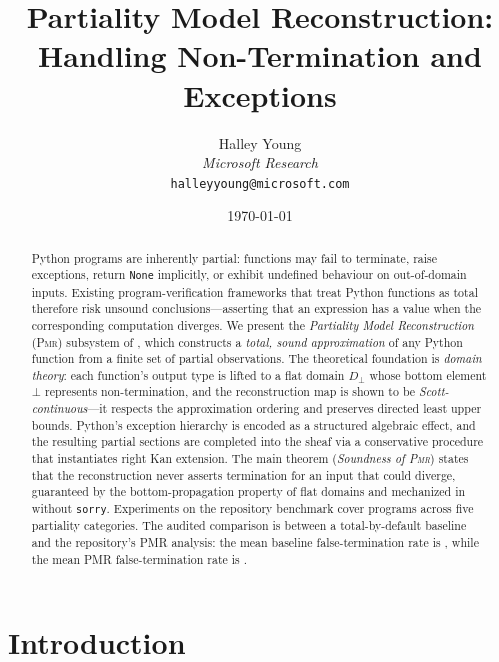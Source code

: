 \documentclass[11pt]{article}
\title{\textbf{Partiality Model Reconstruction:\\
  Handling Non-Termination and Exceptions}}
\author{%
  Halley Young\\
  \textit{Microsoft Research}\\
  \texttt{halleyyoung@microsoft.com}%
}
\date{\today}
\newcommand{\LiftD}[1]{#1_{\bot}}           %
\newcommand{\PMR}{\textsc{Pmr}}            %
\begin{document}
\maketitle

\begin{abstract}
Python programs are inherently partial: functions may fail to terminate,
raise exceptions, return \texttt{None} implicitly, or exhibit undefined
behaviour on out-of-domain inputs.  Existing program-verification
frameworks that treat Python functions as total therefore risk unsound
conclusions---asserting that an expression has a value when the
corresponding computation diverges.
We present the \emph{Partiality Model Reconstruction} (\PMR{}) subsystem
of \JuGeo{}, which constructs a \emph{total, sound approximation} of any
Python function from a finite set of partial observations.
The theoretical foundation is \emph{domain theory}: each function's
output type is lifted to a flat domain $\LiftD{D}$ whose bottom element
$\bot$ represents non-termination, and the reconstruction map is shown
to be \emph{Scott-continuous}---it respects the approximation ordering
and preserves directed least upper bounds.
Python's exception hierarchy is encoded as a structured algebraic effect,
and the resulting partial sections are completed into the \JuGeo{} sheaf
via a conservative procedure that instantiates right Kan extension.
The main theorem (\emph{Soundness of \PMR{}}) states that the
reconstruction never asserts termination for an input that could diverge,
guaranteed by the bottom-propagation property of flat domains and
mechanized in \LEAN{} without \texttt{sorry}.
Experiments on the repository benchmark cover \ppXXXVTotalPrograms{}
programs across five partiality categories.  The audited comparison is
between a total-by-default baseline and the repository's PMR analysis:
the mean baseline false-termination rate is \ppXXXVMeanBaseFtr, while the
mean PMR false-termination rate is \ppXXXVMeanPmrFtr.
\end{abstract}

\newpage

\section{Introduction}\label{sec:intro}
\end{document}
